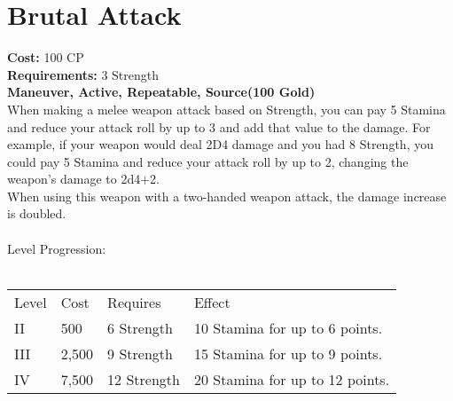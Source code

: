 \section{Brutal Attack}\label{maneuver:brutalAttack}
\textbf{Cost:} 100 CP\\
\textbf{Requirements:} 3 Strength\\
\textbf{Maneuver, Active, Repeatable, Source(100 Gold)}\\
When making a melee weapon attack based on Strength, you can pay 5 Stamina and reduce your attack roll by up to 3 and add that value to the damage.
For example, if your weapon would deal 2D4 damage and you had 8 Strength, you could pay 5 Stamina and reduce your attack roll by up to 2, changing the weapon's damage to 2d4+2.\\
When using this weapon with a two-handed weapon attack, the damage increase is doubled.\\
\\
Level Progression:\\
\\
\begin{tabular}{l | l | l | l}
	Level & Cost & Requires & Effect\\
	II & 500 & 6 Strength & 10 Stamina for up to 6 points.\\
	III & 2,500 & 9 Strength & 15 Stamina for up to 9 points.\\
	IV & 7,500 & 12 Strength & 20 Stamina for up to 12 points.\\
\end{tabular}